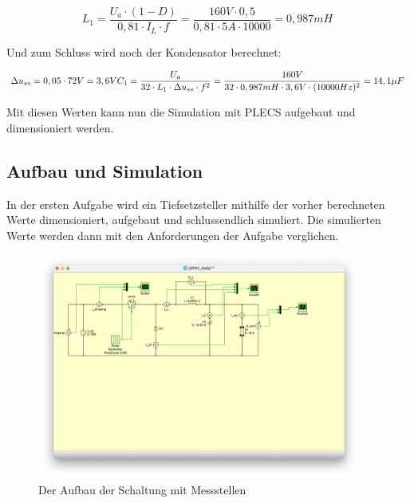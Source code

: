 \documentclass{report}
\begin{document}
\begin{equation}
	L_1 = \frac{U_a \cdot (1-D)}{0,81 \cdot I_L \cdot f} = \frac{160V \cdot 0,5}{0,81 \cdot 5A \cdot 10000} = 0,987mH
	\label{eq:induk}
\end{equation}

Und zum Schluss wird noch der Kondensator berechnet:

\begin{equation}
	\Delta u_{ss} = 0,05 \cdot 72V = 3,6V\\
	C_1 = \frac{U_a}{32 \cdot L_1 \cdot \Delta u_{ss} \cdot f^2} = \frac{160V}{32 \cdot 0,987mH \cdot 3,6V \cdot (10000Hz)^2} = 14,1\mu F
	\label{eq:capa}
\end{equation}


Mit diesen Werten kann nun die Simulation mit PLECS aufgebaut und dimensioniert werden.


\subsection{Aufbau und Simulation}

In der ersten Aufgabe wird ein Tiefsetzsteller mithilfe der vorher berechneten Werte dimensioniert, aufgebaut und schlussendlich simuliert. Die simulierten Werte werden dann mit den Anforderungen der Aufgabe verglichen.

\begin{figure}[hbt!]
	\begin{center}
		\includegraphics[width=0.95\textwidth]{assets/img/aufg1_aufbau.png}
	\end{center}
	\caption{Der Aufbau der Schaltung mit Messstellen}
	\label{fig:aufg1_aufbau}
\end{figure}
\end{document}

